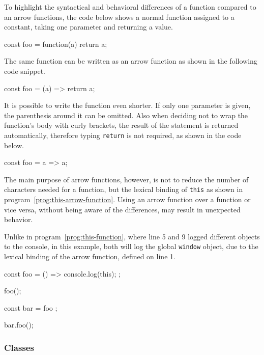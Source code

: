 To highlight the syntactical and behavioral differences of a function compared to an arrow functions, the code below shows a normal function assigned to a constant, taking one parameter and returning a value.
\begin{JsCode}[numbers=none]
const foo = function(a) {
  return a;
}
\end{JsCode}
The same function can be written as an arrow function as shown in the following code snippet.
\begin{JsCode}[numbers=none]
const foo = (a) => {
  return a;
}
\end{JsCode}
It is possible to write the function even shorter. If only one parameter is given, the parenthesis around it can be omitted. Also when deciding not to wrap the function's body with curly brackets, the result of the statement is returned automatically, therefore typing \texttt{return} is not required, as shown in the code below.
\begin{JsCode}[numbers=none]
const foo = a => a;
\end{JsCode}
The main purpose of arrow functions, however, is not to reduce the number of characters needed for a function, but the lexical binding of \texttt{this} as shown in program~\ref{prog:this-arrow-function}. Using an arrow function over a function or vice versa, without being aware of the differences, may result in unexpected behavior.
\begin{program}
\caption{Unlike in program~\ref{prog:this-function}, where line 5 and 9 logged different objects to the console, in this example, both will log the global \texttt{window} object, due to the lexical binding of the arrow function, defined on line 1.}
\label{prog:this-arrow-function}
\begin{JsCode}
const foo = () => {
  console.log(this);
};

foo();

const bar = { foo };

bar.foo();
\end{JsCode}
\end{program}

\subsubsection{Classes}

